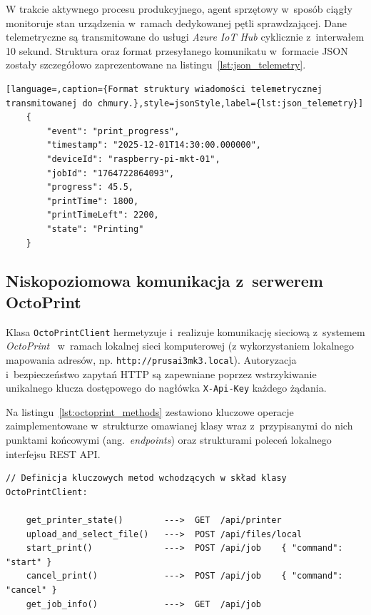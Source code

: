 \documentclass[a4paper,12pt,reqno]{article}
\begin{document}
W trakcie aktywnego procesu produkcyjnego, agent sprzętowy w~sposób ciągły monitoruje stan urządzenia w~ramach dedykowanej pętli sprawdzającej. Dane telemetryczne są transmitowane do usługi \textit{Azure IoT Hub} cyklicznie z~interwałem 10 sekund. Struktura oraz format przesyłanego komunikatu w~formacie JSON zostały szczegółowo zaprezentowane na listingu~\ref{lst:json_telemetry}.

\begin{lstlisting}[language=,caption={Format struktury wiadomości telemetrycznej transmitowanej do chmury.},style=jsonStyle,label={lst:json_telemetry}]
	{
		"event": "print_progress",
		"timestamp": "2025-12-01T14:30:00.000000",
		"deviceId": "raspberry-pi-mkt-01",
		"jobId": "1764722864093",
		"progress": 45.5,
		"printTime": 1800,
		"printTimeLeft": 2200,
		"state": "Printing"
	}
\end{lstlisting}

\subsection{Niskopoziomowa komunikacja z~serwerem OctoPrint}

Klasa \texttt{OctoPrintClient} hermetyzuje i~realizuje komunikację sieciową z~systemem \textit{OctoPrint}~\cite{octoprint} w~ramach lokalnej sieci komputerowej (z wykorzystaniem lokalnego mapowania adresów, np. \texttt{http://prusai3mk3.local}). Autoryzacja i~bezpieczeństwo zapytań HTTP są zapewniane poprzez wstrzykiwanie unikalnego klucza dostępowego do nagłówka \linebreak\texttt{X-Api-Key} każdego żądania.

Na listingu~\ref{lst:octoprint_methods} zestawiono kluczowe operacje zaimplementowane w~strukturze omawianej klasy wraz z~przypisanymi do nich punktami końcowymi (ang.~\textit{endpoints}) oraz strukturami poleceń lokalnego interfejsu REST API.

\begin{lstlisting}[language={},caption={[Struktura metod klasy \texttt{OctoPrintClient} i~ich mapowanie na punkty końcowe API.]\textls[-37]{Struktura metod klasy \texttt{OctoPrintClient} i~ich mapowanie na punkty końcowe API.}},style=tsStyle,label={lst:octoprint_methods}]
	// Definicja kluczowych metod wchodzących w skład klasy OctoPrintClient:
	
	get_printer_state()        --->  GET  /api/printer
	upload_and_select_file()   --->  POST /api/files/local
	start_print()              --->  POST /api/job    { "command": "start" }
	cancel_print()             --->  POST /api/job    { "command": "cancel" }
	get_job_info()             --->  GET  /api/job
\end{lstlisting}
\end{document}
